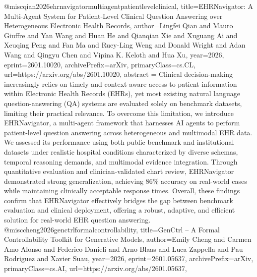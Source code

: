 {}@misc{qian2026ehrnavigatormultiagentpatientlevelclinical,
      title={EHRNavigator: A Multi-Agent System for Patient-Level Clinical Question Answering over Heterogeneous Electronic Health Records}, 
      author={Lingfei Qian and Mauro Giuffre and Yan Wang and Huan He and Qianqian Xie and Xuguang Ai and Xeuqing Peng and Fan Ma and Ruey-Ling Weng and Donald Wright and Adan Wang and Qingyu Chen and Vipina K. Keloth and Hua Xu},
      year={2026},
      eprint={2601.10020},
      archivePrefix={arXiv},
      primaryClass={cs.CL},
      url={https://arxiv.org/abs/2601.10020},
      abstract = {Clinical decision-making increasingly relies on timely and context-aware access to patient information within Electronic Health Records (EHRs), yet most existing natural language question-answering (QA) systems are evaluated solely on benchmark datasets, limiting their practical relevance. To overcome this limitation, we introduce EHRNavigator, a multi-agent framework that harnesses AI agents to perform patient-level question answering across heterogeneous and multimodal EHR data. We assessed its performance using both public benchmark and institutional datasets under realistic hospital conditions characterized by diverse schemas, temporal reasoning demands, and multimodal evidence integration. Through quantitative evaluation and clinician-validated chart review, EHRNavigator demonstrated strong generalization, achieving 86\% accuracy on real-world cases while maintaining clinically acceptable response times. Overall, these findings confirm that EHRNavigator effectively bridges the gap between benchmark evaluation and clinical deployment, offering a robust, adaptive, and efficient solution for real-world EHR question answering.}
}@misc{cheng2026genctrlformalcontrollability,
      title={GenCtrl -- A Formal Controllability Toolkit for Generative Models}, 
      author={Emily Cheng and Carmen Amo Alonso and Federico Danieli and Arno Blaas and Luca Zappella and Pau Rodriguez and Xavier Suau},
      year={2026},
      eprint={2601.05637},
      archivePrefix={arXiv},
      primaryClass={cs.AI},
      url={https://arxiv.org/abs/2601.05637},
}
